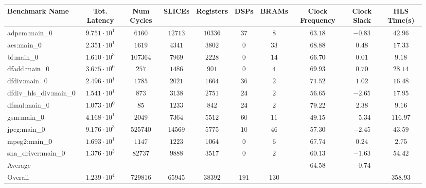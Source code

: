 \begin{tabular}{|l|c|c|c|c|c|c|c|c|c|}
\hline
Benchmark Name          & Tot. Latency           & Num Cycles & SLICEs    & Registers & DSPs    & BRAMs   & Clock Frequency & Clock Slack & HLS Time(s) \\
\hline
adpcm:main\_0           & $ 9.751 \cdot 10^{1} $ & $ 6160   $ & $ 12713 $ & $ 10336 $ & $ 37  $ & $ 8   $ & $ 63.18       $ & $ -0.83   $ & $ 42.96   $ \\
aes:main\_0             & $ 2.351 \cdot 10^{1} $ & $ 1619   $ & $ 4341  $ & $ 3802  $ & $ 0   $ & $ 33  $ & $ 68.88       $ & $ 0.48    $ & $ 17.33   $ \\
bf:main\_0              & $ 1.610 \cdot 10^{3} $ & $ 107364 $ & $ 7969  $ & $ 2228  $ & $ 0   $ & $ 14  $ & $ 66.70       $ & $ 0.01    $ & $ 9.18    $ \\
dfadd:main\_0           & $ 3.675 \cdot 10^{0} $ & $ 257    $ & $ 1486  $ & $ 901   $ & $ 0   $ & $ 4   $ & $ 69.93       $ & $ 0.70    $ & $ 28.14   $ \\
dfdiv:main\_0           & $ 2.496 \cdot 10^{1} $ & $ 1785   $ & $ 2021  $ & $ 1664  $ & $ 36  $ & $ 2   $ & $ 71.52       $ & $ 1.02    $ & $ 16.48   $ \\
dfdiv\_hls\_div:main\_0 & $ 1.541 \cdot 10^{1} $ & $ 873    $ & $ 3138  $ & $ 2751  $ & $ 24  $ & $ 2   $ & $ 56.65       $ & $ -2.65   $ & $ 17.95   $ \\
dfmul:main\_0           & $ 1.073 \cdot 10^{0} $ & $ 85     $ & $ 1233  $ & $ 842   $ & $ 24  $ & $ 2   $ & $ 79.22       $ & $ 2.38    $ & $ 9.16    $ \\
gsm:main\_0             & $ 4.168 \cdot 10^{1} $ & $ 2049   $ & $ 7364  $ & $ 5512  $ & $ 60  $ & $ 11  $ & $ 49.15       $ & $ -5.34   $ & $ 116.97  $ \\
jpeg:main\_0            & $ 9.176 \cdot 10^{3} $ & $ 525740 $ & $ 14569 $ & $ 5775  $ & $ 10  $ & $ 46  $ & $ 57.30       $ & $ -2.45   $ & $ 43.59   $ \\
mpeg2:main\_0           & $ 1.693 \cdot 10^{1} $ & $ 1147   $ & $ 1223  $ & $ 1064  $ & $ 0   $ & $ 6   $ & $ 67.74       $ & $ 0.24    $ & $ 2.75    $ \\
sha\_driver:main\_0     & $ 1.376 \cdot 10^{3} $ & $ 82737  $ & $ 9888  $ & $ 3517  $ & $ 0   $ & $ 2   $ & $ 60.13       $ & $ -1.63   $ & $ 54.42   $ \\
\hline
Average                 & $                    $ & $        $ & $       $ & $       $ & $     $ & $     $ & $ 64.58       $ & $ -0.74   $ & $         $ \\
\hline
Overall                 & $ 1.239 \cdot 10^{4} $ & $ 729816 $ & $ 65945 $ & $ 38392 $ & $ 191 $ & $ 130 $ & $             $ & $         $ & $ 358.93  $ \\
\hline
\end{tabular}
